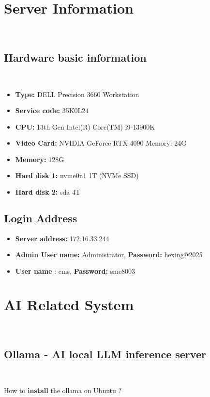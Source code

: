 \section{Server Information}\

\subsection{Hardware basic information}\

\begin{itemize}
    \item \textbf{Type:} DELL Precision 3660 Workstation
    \item \textbf{Service code:} 35K0L24
    \item \textbf{CPU:} 13th Gen Intel(R) Core(TM) i9-13900K
    \item \textbf{Video Card:} NVIDIA GeForce RTX 4090  Memory: 24G
    \item \textbf{Memory:} 128G
    \item \textbf{Hard disk 1:} nvme0n1 1T (NVMe SSD)
    \item \textbf{Hard disk 2:} sda 4T
\end{itemize}

\subsection{Login Address}
\begin{itemize}
    \item \textbf{Server address:} 172.16.33.244
    \item \textbf{Admin User name:} Administrator, \textbf{Password:} hexing@2025
    \item \textbf{User name} : ems,\textbf{ Password:} sme8003
\end{itemize}

\section{AI Related System}\

\subsection{Ollama - AI local LLM inference server}\

How to \textbf{install} the ollama on Ubuntu ?
\vspace{0.5cm}
%

